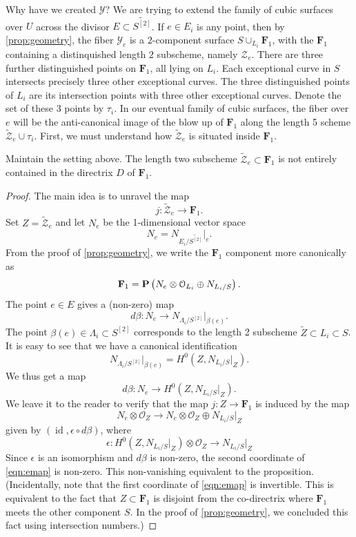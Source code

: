 \documentclass[12pt,reqno]{amsart}
\DeclareMathOperator{\id}{id}
\renewcommand{\to}{{\longrightarrow}}
\numberwithin{equation}{section}
\renewcommand{\O}{\mathcal O}
\newcommand{\F}{\mathbf F}
\newcommand{\td}{\widetilde}
\begin{document}
Why have we created $\mathcal{Y}$?
We are trying to extend the family of cubic surfaces over $U$ across the
divisor $E \subset \td{S^{[2]}}$.
If $e \in E_{i}$ is any point, then by \autoref{prop:geometry}, the fiber $\mathcal{Y}_{e}$ is a $2$-component surface $S \cup_{L_{i}} \F_{1}$, with the $\F_{1}$ containing a distinquished length $2$ subscheme, namely $\mathcal{Z}_{e}$.
There are three further distinguished points on $\F_{1}$, all lying on $L_i$.
Each exceptional curve in $S$ intersects precisely three other exceptional curves.
The three distinguished points of $L_i$ are its intersection points with three other exceptional curves. Denote the set of these 3 points by $\tau_i$.
In our eventual family of cubic surfaces, the fiber over $e$ will be the anti-canonical image of the blow up of $\F_1$ along the length 5 scheme $\widetilde{\mathcal Z}_e \cup \tau_i$.
First, we must understand how $\td{\mathcal{Z}}_{e}$ is situated
inside $\F_{1}$.
\begin{proposition}
  \label{prop:nodirectrix} Maintain the setting above.  The length two
  subscheme $\td{\mathcal{Z}}_{e} \subset \F_{1}$ is not entirely
  contained in the directrix $D$ of $\F_{1}$.
\end{proposition}
\begin{proof}
  The main idea is to unravel the map
  \[ j \colon \widetilde {\mathcal Z}_e \to \F_1.\]
  Set $Z = \widetilde{\mathcal Z}_e$ and let $N_e$ be the 1-dimensional vector space
  \[ N_e = N_{E_i/\widetilde{S^{[2]}}} \big|_e. \]
  From the proof of \autoref{prop:geometry}, we write the $\F_1$ component more canonically as
  \[
    \F_1 = \P\left(N_e \otimes \O_{L_i} \oplus N_{L_i/S}\right).
  \]
  The point $e \in E$ gives a (non-zero) map
  \[
    d \beta \colon N_e \to N_{\Lambda_i / S^{[2]}}|_{\beta(e)}.
  \]
  The point $\beta(e) \in \Lambda_i \subset S^{[2]}$ corresponds to the length 2 subscheme $\widetilde Z \subset L_i \subset S$.
  It is easy to see that we have a canonical identification
  \[
    N_{\Lambda_i / S^{[2]}}\big |_{\beta(e)} = H^0\left(Z, N_{L_i/S}|_Z\right).
  \]
  We thus get a map
  \[
    d \beta \colon N_e \to H^0\left(Z, N_{L_i/S}|_Z\right).
  \]
  We leave it to the reader to verify that the map $j \colon Z \to \F_1$ is induced by the map
  \begin{equation}\label{eqn:emap}
    N_e \otimes \O_Z \to N_e \otimes \O_Z \oplus N_{L_i/S}|_Z
  \end{equation}
  given by $(\id, \epsilon \circ d\beta)$, where
  \[
    \epsilon \colon H^0\left(Z, N_{L_i/S}|_Z\right) \otimes \O_Z \to N_{L_i/S}|_Z
  \]
  Since $\epsilon$ is an isomorphism and $d \beta$ is non-zero, the second coordinate of \eqref{eqn:emap} is non-zero.
  This non-vanishing equivalent to the proposition.
  (Incidentally, note that the first coordinate of \eqref{eqn:emap} is invertible.
  This is equivalent to the fact that $Z \subset \F_1$ is disjoint from the co-directrix where $\F_1$ meets the other component $S$.
  In the proof of \autoref{prop:geometry}, we concluded this fact using intersection numbers.)
\end{proof}
\end{document}
